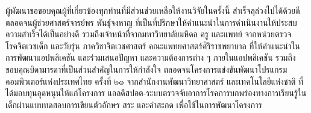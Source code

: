\documentclass[12pt,oneside,openright,a4paper]{cpe-thai-project}
\begin{document}
\preface
ผู้พัฒนาขอขอบคุณผู้ที่เกี่ยวข้องทุกท่านที่มีส่วนช่วยเหลือให้งานวิจัยในครั้งนี้ สำเร็จลุล่วงไปได้ด้วยดี 
ตลอดจนผู้ช่วยศาสตร์จารย์พร พันธุ์จงหาญ ที่เป็นที่ปรึกษาให้คำแนะนำในการดำเนินงานให้ประสบความสำเร็จได้เป็นอย่างดี 
รวมถึงเจ้าหน้าที่จากมหาวิทยาลัยมหิดล ครู และแพทย์ จากหน่วยตรวจโรคจิตเวชเด็ก และวัยรุ่น ภาควิชาจิตเวชศาสตร์ คณะแพทยศาสตร์ศิริราชพยาบาล
 ที่ให้คำแนะนำในการพัฒนาแอปพลิเคชัน และร่วมเสนอปัญหา และความต้องการต่าง ๆ ภายในแอปพลิเคชัน  รวมถึงขอบคุณบิดามารดาที่เป็นส่วนสำคัญในการให้กำลังใจ ตลอดจนโครงการแข่งขันพัฒนาโปรแกรมคอมพิวเตอร์แห่งประเทศไทย ครั้งที่ ๒๓ 
จากสำนักงานพัฒนาวิทยาศาสตร์ และเทคโนโลยีแห่งชาติ ที่ได้มอบทุนอุดหนุนให้แก่โครงการ แอลดีสปอต-ระบบตรวจจับอาการโรคการบกพร่องทางการเรียนรู้ในเด็กผ่านแบบทดสอบการเขียนตัวอักษร สระ และคำสะกด เพื่อใช้ในการพัฒนาโครงการ

\tableofcontents                    
\listoftables
\listoffigures                      

\end{document}
